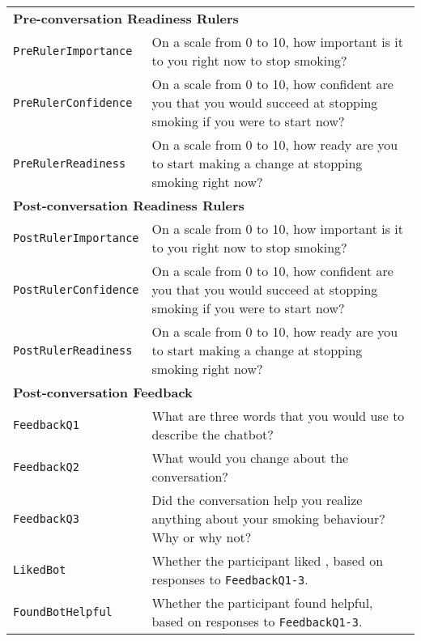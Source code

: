 \begin{longtable}{l p{10cm}}
	\multicolumn{2}{l}{\textbf{Pre-conversation Readiness Rulers}}                                                                                                                      \\
	\texttt{PreRulerImportance}       & On a scale from 0 to 10, how important is it to you right now to stop smoking?                                                                  \\
	\texttt{PreRulerConfidence}       & On a scale from 0 to 10, how confident are you that you would succeed at stopping smoking if you were to start now?                             \\
	\texttt{PreRulerReadiness}        & On a scale from 0 to 10, how ready are you to start making a change at stopping smoking right now?                                              \\
	\midrule

	\multicolumn{2}{l}{\textbf{Post-conversation Readiness Rulers}}                                                                                                                     \\
	\texttt{PostRulerImportance}      & On a scale from 0 to 10, how important is it to you right now to stop smoking?                                                                  \\
	\texttt{PostRulerConfidence}      & On a scale from 0 to 10, how confident are you that you would succeed at stopping smoking if you were to start now?                             \\
	\texttt{PostRulerReadiness}       & On a scale from 0 to 10, how ready are you to start making a change at stopping smoking right now?                                              \\
	\midrule

	\multicolumn{2}{l}{\textbf{Post-conversation Feedback}}                                                                                                                             \\
	\texttt{FeedbackQ1}               & What are three words that you would use to describe the chatbot?                                                                                \\
	\texttt{FeedbackQ2}               & What would you change about the conversation?                                                                                                   \\
	\texttt{FeedbackQ3}               & Did the conversation help you realize anything about your smoking behaviour? Why or why not?                                                    \\
	\texttt{LikedBot}                 & Whether the participant liked \sysname, based on responses to \texttt{Feedback\-Q1-3}.                                                          \\
	\texttt{FoundBotHelpful}          & Whether the participant found \sysname helpful, based on responses to \texttt{Feedback\-Q1-3}.                                                  \\
	\midrule


\end{longtable}
